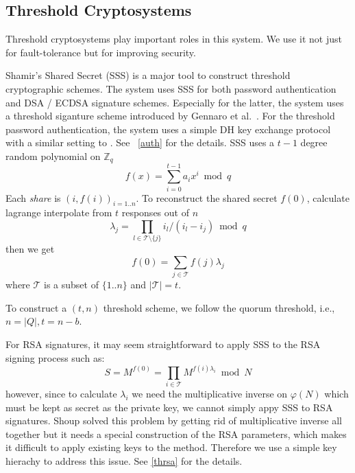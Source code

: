\subsection{Threshold Cryptosystems}
Threshold cryptosystems play important roles in this system. We use it
not just for fault-tolerance but for improving security.

Shamir's Shared Secret (SSS) \cite{shamir} is a major tool to
construct threshold cryptographic schemes. The system uses SSS for
both password authentication and DSA / ECDSA signature
schemes. Especially for the latter, the system uses a threshold
siganture scheme introduced by Gennaro et al.\ \cite{Gennaro}. For the
threshold password authentication, the system uses a simple DH key
exchange protocol with a similar setting to \cite{ford}.
See ~\ref{auth} for the details.
SSS uses a $t-1$ degree random polynomial on $\mathbb{Z}_q$
\[
  f(x) = \sum_{i=0}^{t-1}a_ix^i \bmod q
\]
Each {\em share} is $(i, f(i))_{i = 1..n}$. To reconstruct the shared
secret $f(0)$, calculate lagrange interpolate from $t$ responses out
of $n$
\[
    \lambda_j = \prod_{l \in \mathcal{T} \setminus \{j\}}
    i_l / (i_l - i_j) \bmod q
\]
then we get
\[
  f(0) = \sum_{j \in \mathcal{T}} f(j)\lambda_j
\]
where $\mathcal{T}$ is a subset of $\{1..n\}$ and $|\mathcal{T}| =
t$.

To construct a $(t, n)$ threshold scheme, we follow the quorum
threshold, i.e., $n = |Q|, t = n-b$.

For RSA signatures, it may seem straightforward to apply SSS to the
RSA signing process such as:
\[ S = M^{f(0)} = \prod_{i \in \mathcal{T}} M^{f(i)\lambda_i} \bmod N \]
however, since to calculate $\lambda_i$ we need the multiplicative
inverse on $\varphi(N)$ which must be kept as secret as the private
key, we cannot simply appy SSS to RSA signatures. Shoup \cite{shoup}
solved this problem by getting rid of multiplicative inverse all
together but it needs a special construction of the RSA parameters,
which makes it difficult to apply existing keys to the
method. Therefore we use a simple key hierachy to address this
issue. See \ref{thrsa} for the details.


